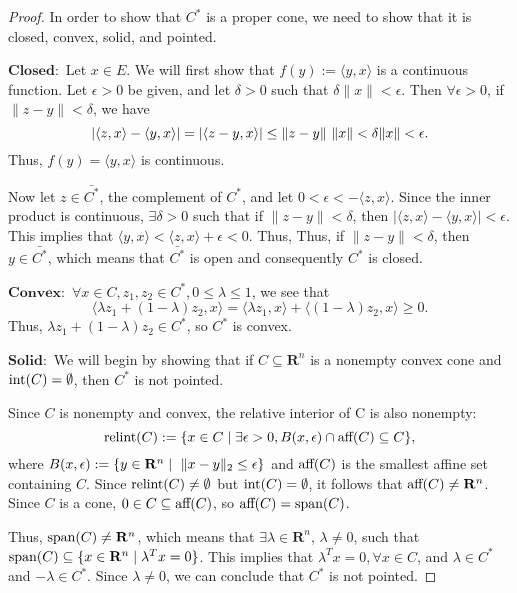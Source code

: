 	\begin{proof}
		In order to show that $C^*$ is a proper cone, we need to show that it is closed, convex, solid, and pointed. 
		
		$\mathbf{Closed: }$ Let $x \in E$. We will first show that $f(y) := \langle y, x \rangle$ is a continuous function. Let $\epsilon >0$ be given, and let $\delta > 0$ such that $\delta \|x\| < \epsilon$. Then $\forall \epsilon > 0$, if $\|z-y\| < \delta$, we have 
		$$
		|\langle z, x\rangle - \langle y, x\rangle| = |\langle z-y, x\rangle| \leq \|z-y\|\textnormal{ } \|x\| < \delta \|x\| < \epsilon.
		$$
		Thus, $f(y) = \langle y, x\rangle$ is continuous.
		
		Now let $z \in \bar{C^*}$, the complement of $C^*$, and let $0 < \epsilon < -\langle z,x\rangle$. Since the inner product is continuous, $\exists \delta > 0$ such that if $\|z-y\| < \delta$, then $|\langle z, x\rangle - \langle y, x \rangle | < \epsilon$. This implies that $\langle y, x \rangle < \langle z, x\rangle + \epsilon < 0$. Thus, Thus, if $\|z-y\| < \delta$, then $y \in \bar{C^*}$, which means that $\bar{C^*}$ is open and consequently  $C^*$ is closed. 
		
		$\mathbf{Convex: }$ $\forall x \in C, z_1 , z_2 \in C^*, 0 \leq \lambda \leq 1$, we see that
		$$\langle \lambda z_1 + (1 - \lambda) z_2 , x \rangle = \langle \lambda z_1 , x \rangle + \langle (1 - \lambda) z_2 , x \rangle \geq 0.$$
		Thus, $\lambda z_1 + (1 - \lambda) z_2 \in C^*$, so $C^*$ is convex.
		
		$\mathbf{Solid: }$ We will begin by showing that if $C \subseteq \mathbf{R}^n$ is a nonempty convex cone and $\textnormal{int}(C) = \emptyset$, then $C^*$ is not pointed.
		
		Since $C$ is nonempty and convex, the relative interior of C is also nonempty:
		$$
		\textnormal{relint}(C) := \{x \in C \mid \exists \epsilon > 0, B(x,\epsilon) \cap \textnormal{aff}(C) \subseteq C\},
		$$
		where $B(x, \epsilon) := \{y \in \mathbf{R}^n \mid \textnormal{ } \|x-y\|_2 \leq \epsilon\}$ and $\textnormal{aff}(C)$ is the smallest affine set containing $C$. Since $\textnormal{relint}(C) \neq \emptyset$ but $\textnormal{int}(C) = \emptyset$, it follows that $\textnormal{aff}(C) \neq \mathbf{R}^n$. 
		Since $C$ is a cone, $0 \in C \subseteq \textnormal{aff}(C)$, so $\textnormal{aff}(C) = \textnormal{span}(C)$. 
		
		Thus, $\textnormal{span}(C) \neq \mathbf{R}^n$, which means that $\exists \lambda \in \mathbf{R}^n$, $\lambda \neq 0$, such that $\textnormal{span}(C) \subseteq \{ x \in \mathbf{R}^n \mid \lambda^T x = 0 \}$. This implies that $\lambda^T x = 0, \forall x \in C$, and $\lambda \in C^*$ and $-\lambda \in C^*$. Since $\lambda \neq 0$, we can conclude that $C^*$ is not pointed.
		

\end{proof}
